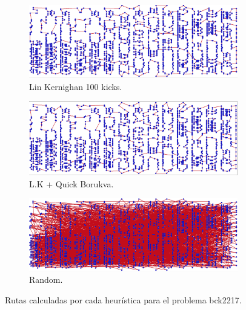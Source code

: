 \documentclass[13pt,a4paper]{article}
\begin{document}
\begin{figure}[b]
    \begin{subfigure}[t]{0.3\textwidth}
        \centering
        \includegraphics[width=\textwidth]{img/3/L100.png}
        \caption{Lin Kernighan 100 kicks.}
    \end{subfigure}
    \begin{subfigure}[t]{0.3\textwidth}
        \centering
        \includegraphics[width=\textwidth]{img/3/L+Q.png}
        \caption{L.K + Quick Borukva.}
    \end{subfigure}
    \begin{subfigure}[t]{0.3\textwidth}
        \centering
        \includegraphics[width=\textwidth]{img/3/R.png}
        \caption{Random.}
    \end{subfigure}
    \caption{Rutas calculadas por cada heurística para el problema bck2217.}
\end{figure}

    \setlength{\parskip}{1em}
    \newpage
\end{document}

